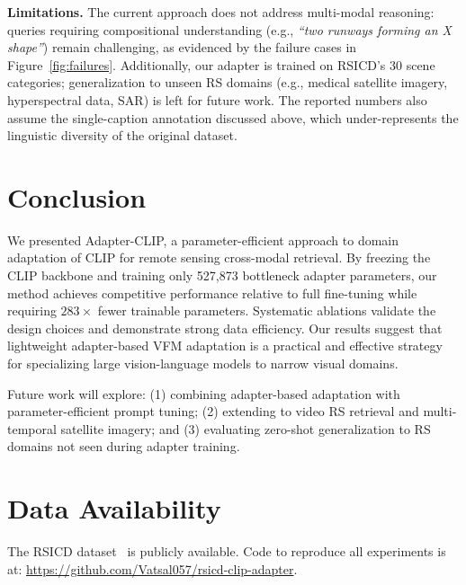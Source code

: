 \documentclass[review,12pt]{elsarticle}
\begin{document}
\textbf{Limitations.}
The current approach does not address multi-modal reasoning: queries
requiring compositional understanding (e.g., \textit{``two runways forming
an X shape''}) remain challenging, as evidenced by the failure cases in
Figure~\ref{fig:failures}. Additionally, our adapter is trained on
RSICD's 30 scene categories; generalization to unseen RS domains
(e.g., medical satellite imagery, hyperspectral data, SAR) is left for
future work. The reported numbers also assume the single-caption
annotation discussed above, which under-represents the linguistic
diversity of the original dataset.

\section{Conclusion}
\label{sec:conclusion}

We presented Adapter-CLIP, a parameter-efficient approach to domain
adaptation of CLIP for remote sensing cross-modal retrieval. By freezing
the CLIP backbone and training only 527,873 bottleneck adapter parameters,
our method achieves competitive performance relative to full fine-tuning
while requiring $283\times$ fewer trainable parameters. Systematic
ablations validate the design choices and demonstrate strong data
efficiency. Our results suggest that lightweight adapter-based VFM
adaptation is a practical and effective strategy for specializing large
vision-language models to narrow visual domains.

Future work will explore: (1) combining adapter-based adaptation with
parameter-efficient prompt tuning; (2) extending to video RS retrieval and
multi-temporal satellite imagery; and (3) evaluating zero-shot
generalization to RS domains not seen during adapter training.

\section*{Data Availability}
The RSICD dataset~\cite{lu2017exploring} is publicly available. Code to
reproduce all experiments is at: \url{https://github.com/Vatsal057/rsicd-clip-adapter}.



\end{document}
